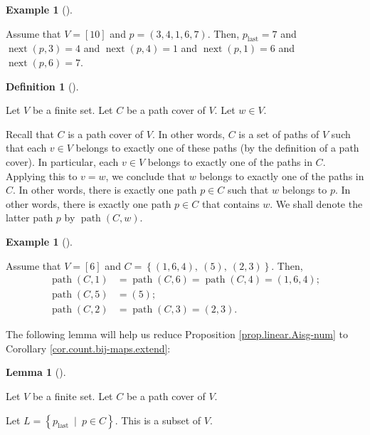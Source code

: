 \documentclass[numbers=enddot,12pt,final,onecolumn,notitlepage]{scrartcl}%
\numberwithin{exer}{section}
\theoremstyle{definition}
\newtheorem{lem}[theo]{Lemma}
\newenvironment{lemma}[1][]
{\begin{lem}[#1]\begin{leftbar}}
{\end{leftbar}\end{lem}}
\newtheorem{defi}[theo]{Definition}
\newenvironment{definition}[1][]
{\begin{defi}[#1]\begin{leftbar}}
{\end{leftbar}\end{defi}}
\newtheorem{exam}[theo]{Example}
\newenvironment{example}[1][]
{\begin{exam}[#1]\begin{leftbar}}
{\end{leftbar}\end{exam}}
\newenvironment{verlong}{}{}
\begin{document}
\begin{verlong}
\begin{example}
Assume that $V=\left[  10\right]  $ and $p=\left(  3,4,1,6,7\right)  $. Then,
$p_{\operatorname*{last}}=7$ and $\operatorname*{next}\left(  p,3\right)  =4$
and $\operatorname*{next}\left(  p,4\right)  =1$ and $\operatorname*{next}%
\left(  p,1\right)  =6$ and $\operatorname*{next}\left(  p,6\right)  =7$.
\end{example}

\begin{definition}
Let $V$ be a finite set. Let $C$ be a path cover of $V$. Let $w\in V$.

Recall that $C$ is a path cover of $V$. In other words, $C$ is a set of paths
of $V$ such that each $v\in V$ belongs to exactly one of these paths (by the
definition of a path cover). In particular, each $v\in V$ belongs to exactly
one of the paths in $C$. Applying this to $v=w$, we conclude that $w$ belongs
to exactly one of the paths in $C$. In other words, there is exactly one path
$p\in C$ such that $w$ belongs to $p$. In other words, there is exactly one
path $p\in C$ that contains $w$. We shall denote the latter path $p$ by
$\operatorname*{path}\left(  C,w\right)  $.
\end{definition}

\begin{example}
Assume that $V=\left[  6\right]  $ and $C=\left\{  \left(  1,6,4\right)
,\ \left(  5\right)  ,\ \left(  2,3\right)  \right\}  $. Then,%
\begin{align*}
\operatorname*{path}\left(  C,1\right)   &  =\operatorname*{path}\left(
C,6\right)  =\operatorname*{path}\left(  C,4\right)  =\left(  1,6,4\right)
;\\
\operatorname*{path}\left(  C,5\right)   &  =\left(  5\right)  ;\\
\operatorname*{path}\left(  C,2\right)   &  =\operatorname*{path}\left(
C,3\right)  =\left(  2,3\right)  .
\end{align*}

\end{example}

The following lemma will help us reduce Proposition \ref{prop.linear.Aisg-num}
to Corollary \ref{cor.count.bij-maps.extend}:

\begin{lemma}
\label{lem.linear.Aisg-num.1}Let $V$ be a finite set. Let $C$ be a path cover
of $V$.

Let $L=\left\{  p_{\operatorname*{last}}\ \mid\ p\in C\right\}  $. This is a
subset of $V$.


\end{lemma}
\end{verlong}
\end{document}
